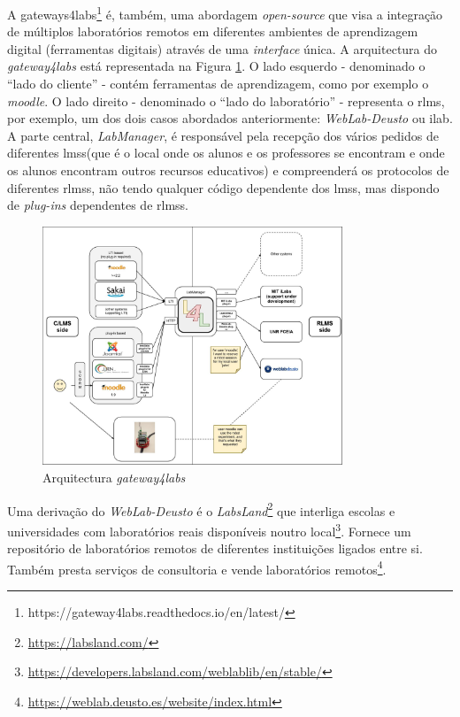 A gateways4labs\footnote{https://gateway4labs.readthedocs.io/en/latest/} é, também, uma abordagem \textit{open-source} que visa a integração de múltiplos laboratórios remotos em diferentes ambientes de aprendizagem digital (ferramentas digitais) através de uma \textit{interface} única.
A arquitectura do \textit{gateway4labs} está representada na Figura \ref{fig:arqgateway4labs}. O lado esquerdo - denominado o ``lado do cliente'' - contém ferramentas de aprendizagem, como por exemplo o \textit{moodle}. O lado direito - denominado o ``lado do laboratório'' - representa o \acrshort{rlms}, por exemplo, um dos dois casos abordados anteriormente: \textit{WebLab-Deusto} ou \acrshort{ilab}\cite{Orduñag4l}.
A parte central, \textit{LabManager}, é responsável pela recepção dos vários pedidos de diferentes \acrfull{lms}s(que é o local onde os alunos e os professores se encontram e onde os alunos encontram outros recursos educativos) e compreenderá os protocolos de diferentes \acrshort{rlms}s, não tendo qualquer código dependente dos \acrshort{lms}s, mas dispondo de \textit{plug-ins} dependentes de \acrshort{rlms}s\cite{Orduñag4l}\cite{g4ldocumentation}.
\begin{figure}[hbtp]
    \centering
    \includegraphics[width=0.8\textwidth]{figures/g4l_general_architecture.png}
    \caption{Arquitectura \textit{gateway4labs}}
    \label{fig:arqgateway4labs}
\end{figure}

Uma derivação do \textit{WebLab-Deusto} é o \textit{LabsLand}\footnote{\url{https://labsland.com/}} que interliga escolas e universidades com laboratórios reais disponíveis noutro local\footnote{\url{https://developers.labsland.com/weblablib/en/stable/}}. Fornece um repositório de laboratórios remotos de diferentes instituições ligados entre si. Também presta serviços de consultoria e vende laboratórios remotos\footnote{\url{https://weblab.deusto.es/website/index.html}}.

